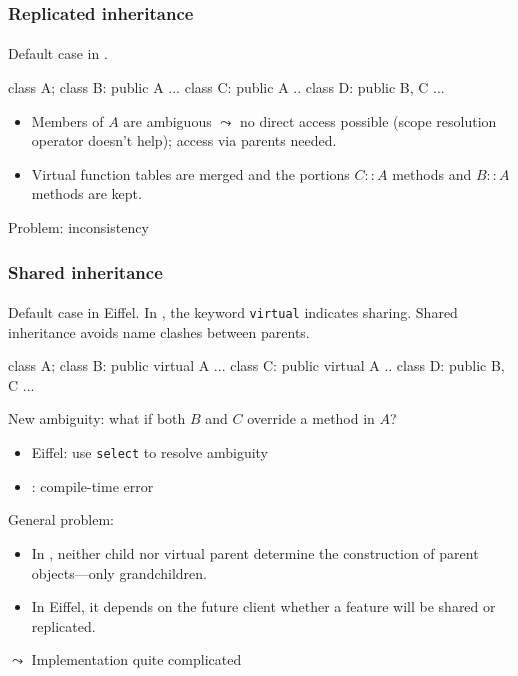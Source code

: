 \documentclass{beamer}
\begin{document}
\begin{frame}[fragile]
\frametitle{Replicated inheritance}
\framesubtitle{}
Default case in \Cpp. 
\begin{cplus3}
class A;
class B: public A {...}
class C: public A {.. }
class D: public B, C {...}
\end{cplus3}


\begin{itemize}
\item Members of $A$ are ambiguous $\leadsto$ no direct access possible
(scope resolution operator doesn't help); access via parents needed.  
\item Virtual function tables are merged  and the portions $C::A$ methods
and $B::A$ methods are kept. 

\end{itemize}
\bigskip

Problem: inconsistency
\end{frame}

\begin{frame}[fragile]
\frametitle{Shared inheritance}
\framesubtitle{}
Default case in Eiffel. In \cpp, the keyword \texttt{virtual} 
indicates sharing.
Shared inheritance avoids name clashes between parents.

\begin{cplus3}
class A;
class B: public virtual A {...}
class C: public virtual A {.. }
class D: public B, C {...}
\end{cplus3}



New ambiguity: what if both $B$ and $C$ override a method in $A$?
\begin{itemize}
\item Eiffel: use \texttt{select} to resolve ambiguity
\item \Cpp: compile-time error
\end{itemize}

General problem:


\begin{itemize}
\item In \Cpp, neither child nor virtual parent determine the construction
of parent objects---only grandchildren.
\item In Eiffel, it depends on the future client whether
a feature will be shared or replicated.
\end{itemize}
$\leadsto$ Implementation quite 
complicated 
\end{frame}
\end{document}
